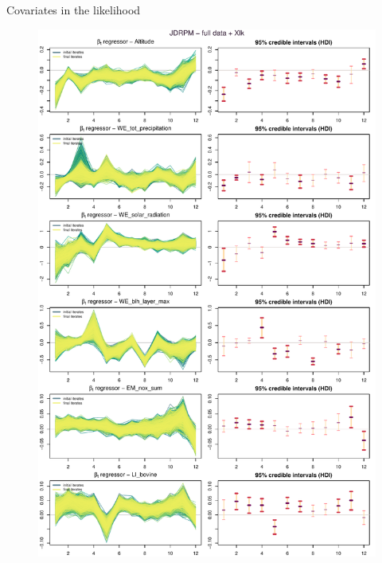 \documentclass[
	11pt, %
 xcolor={dvipsnames,svgnames}
]{beamer}
\begin{document}
\begin{frame}{Covariates in the likelihood}
\begin{figure}[!p]
    \includegraphics[clip, trim=0px 0cm 0px 26.6cm, width=1\linewidth]{Testing/Covariates/better likelihood plots/up_LINES_beta_TR_plus_CIJDRPM - full data + Xlk.pdf}
    \label{fig: lk regressor altitude and friends full}
\end{figure}
\end{frame}

\end{document}
